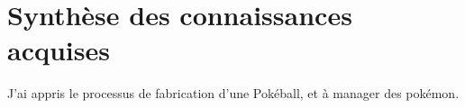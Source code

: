 \documentclass[../main.tex]{subfiles}
\begin{document}
\section{Synthèse des connaissances acquises}

J'ai appris le processus de fabrication d'une Pokéball, et à manager des pokémon.
\end{document}
